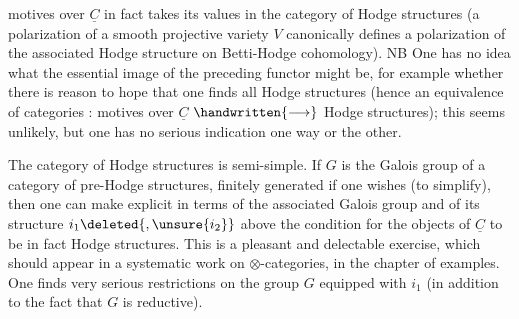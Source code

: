 %
motives over $\underline{C}$ in fact takes its values in the category of Hodge structures (a polarization of a smooth projective variety $V$ canonically defines a polarization of the associated Hodge structure on Betti-Hodge cohomology). NB One has no idea what the essential image of the preceding functor might be, for example whether there is reason to hope that one finds all Hodge structures (hence an equivalence of categories : motives over $\underline{C}$ $\handwritten{\longrightarrow}$ Hodge structures); this seems unlikely, but one has no serious indication one way or the other.

The category of  Hodge structures is semi-simple.  If $G$ is the Galois group of a category  of pre-Hodge structures, finitely generated if one wishes (to simplify), then one can make explicit in terms of the associated Galois group and of its structure $i_1\deleted{,\unsure{i_2}}$ above the condition  for the objects of $\underline{C}$ to be in fact Hodge structures. This is a pleasant and delectable exercise, which should appear in a systematic work on $\otimes$-categories, in the chapter of examples. One finds very serious restrictions on the group $G$  equipped with $i_1$ (in addition to the fact that $G$ is reductive).

